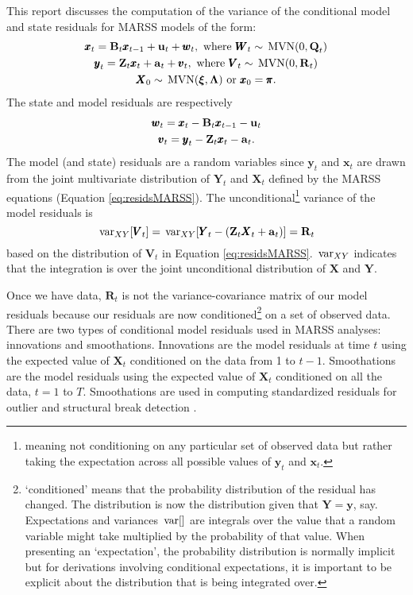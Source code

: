 \documentclass[]{article}
\def\xixi{\mbox{\boldmath $\xi$}}
\def\pipi{\pmb{\pi}}
\def\LAM{\mbox{\boldmath $\Lambda$}}
\def\UPS{\mbox{\boldmath $\Upsilon$}}
\def\XI{\mbox{\boldmath $\Xi$}}
\def\BB{\mbox{$\mathbf B$}}	\def\bb{\mbox{$\mathbf b$}} \def\Bb{\mbox{$\mathbf J$}} \def\Ba{\mbox{$\mathbf L$}} \def\Bm{\UPS}
\def\MVN{\,\textup{\textrm{MVN}}}
\def\QQ{\mbox{$\mathbf Q$}}	 \def\qq{\mbox{$\mathbf q$}} \def\Qb{\mbox{$\mathbf G$}}  \def\Qm{\mathbb{Q}}
\def\RR{\mbox{$\mathbf R$}}	 \def\rr{\mbox{$\mathbf r$}} \def\Rb{\mbox{$\mathbf H$}}	\def\Rm{\mathbb{R}}
\def\VV{\mbox{$\pmb{V}$}}	\def\vv{\mbox{$\pmb{v}$}}
\def\WW{\mbox{$\pmb{W}$}}	\def\ww{\mbox{$\pmb{w}$}}
\def\XX{\mbox{$\pmb{X}$}}	\def\xx{\mbox{$\pmb{x}$}}
\def\YY{\mbox{$\pmb{Y}$}}	\def\yy{\mbox{$\pmb{y}$}}
\def\ZZ{\mbox{$\mathbf Z$}}	\def\zz{\mbox{$\mathbf z$}}	\def\Zb{\mbox{$\mathbf M$}} \def\Za{\mbox{$\mathbf N$}} \def\Zm{\XI}
\def\var{\,\textup{\textrm{var}}}
\begin{document}
This report discusses the computation of the variance of the conditional model and state residuals for MARSS models of the  form:
\begin{equation}\label{eq:residsMARSS}
\begin{gathered}
\xx_t = \BB_t\xx_{t-1} + \uu_t + \ww_t, \text{ where } \WW_t \sim \MVN(0,\QQ_t)\\
\yy_t = \ZZ_t\xx_t + \aa_t + \vv_t, \text{ where } \VV_t \sim \MVN(0,\RR_t)\\
\XX_0 \sim \MVN(\xixi,\LAM) \text{ or } \xx_0 = \pipi .
\end{gathered}
\end{equation}
The state and model residuals are respectively
\begin{equation}\label{eq:resids}
\begin{gathered}
\ww_t = \xx_t - \BB_t\xx_{t-1} - \uu_t\\
\vv_t = \yy_t - \ZZ_t\xx_t - \aa_t .
\end{gathered}
\end{equation}
The model (and state) residuals are a random variables since $\yy_t$ and $\xx_t$ are drawn from the joint multivariate distribution of $\YY_t$ and $\XX_t$ defined by the MARSS equations (Equation \ref{eq:residsMARSS}).
The unconditional\footnote{meaning not conditioning on any particular set of observed data but rather taking the expectation across all possible values of $\yy_t$ and $\xx_t$.} variance of the model residuals is
\begin{equation}\label{eq:unconditiondistofVt}
\var_{XY}[\VV_t] = \var_{XY}[\YY_t - (\ZZ_t \XX_t + \aa_t)] = \RR_t\\
\end{equation}
based on the distribution of $\VV_t$ in Equation \ref{eq:residsMARSS}.  $\var_{XY}$ indicates that the integration is over the joint unconditional distribution of $\XX$ and $\YY$. 

Once we have data, $\RR_t$ is not the variance-covariance matrix of our model residuals because our residuals are now conditioned\footnote{`conditioned' means that the probability distribution of the residual has changed. The distribution is now the distribution given that $\YY=\yy$, say. Expectations and variances $\var[ ]$ are integrals over the value that a random variable might take multiplied by the probability of that value. When presenting an   `expectation', the probability distribution is normally implicit but for derivations involving conditional expectations, it is important to be explicit about the distribution that is being integrated over.} on a set of observed data. There are two types of conditional model residuals used in MARSS analyses: innovations and smoothations.  Innovations are the model residuals at time $t$ using the expected value of $\XX_t$ conditioned on the data from 1 to $t-1$.  Smoothations  are the model residuals using the expected value of $\XX_t$ conditioned on all the data, $t=1$ to $T$.  Smoothations are used in computing standardized residuals for outlier and structural break detection \citep{HarveyKoopman1992, Harveyetal1998, deJongPenzer1998, CommandeurKoopman2007}.
\end{document}
